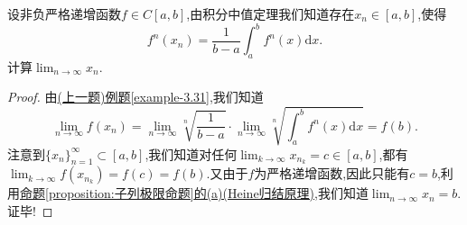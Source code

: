 \documentclass[../../main.tex]{subfiles}%
\begin{document}
\begin{example}
设非负严格递增函数\(f \in C[a,b]\),由积分中值定理我们知道存在\(x_n \in [a,b]\),使得
\[
f^n(x_n) = \frac{1}{b - a} \int_{a}^{b} f^n(x)\mathrm{d}x.
\]
计算\(\lim_{n \to \infty} x_n\).
\end{example}
\begin{proof}
由\hyperref[example-3.31]{(上一题)例题\ref{example-3.31}},我们知道
\[
\lim_{n \to \infty} f(x_n) = \lim_{n \to \infty} \sqrt[n]{\frac{1}{b - a}} \cdot \lim_{n \to \infty} \sqrt[n]{\int_{a}^{b} f^n(x)\mathrm{d}x} = f(b).
\]
注意到\(\{x_n\}_{n = 1}^{\infty} \subset [a,b]\),我们知道对任何\(\lim_{k \to \infty} x_{n_k} = c \in [a,b]\),都有\(\lim_{k \to \infty} f(x_{n_k}) = f(c) = f(b)\).又由于$f$为严格递增函数,因此只能有\(c = b\),利用\hyperref[proposition:子列极限命题]{命题\ref{proposition:子列极限命题}的(a)(Heine归结原理)},我们知道\(\lim_{n \to \infty} x_n = b\).证毕!
\end{proof}
\end{document}
